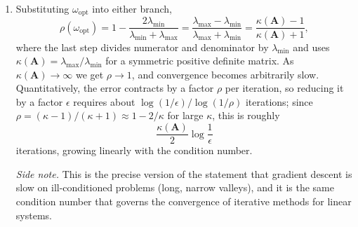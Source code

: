 \begin{solution}
\begin{enumerate}[label=(\alph*)]
        because $\lambda \mapsto 1 - \omega\lambda$ is decreasing, so the extreme values over the eigenvalues are attained at $\lambda_{\min}$ and $\lambda_{\max}$. Each term is a V-shaped (piecewise linear) function of $\omega$, with vertices at $\omega = 1/\lambda_{\min}$ and $\omega = 1/\lambda_{\max}$ respectively, so their maximum is minimized where the decreasing branch of the first meets the increasing branch of the second:
        \[
            1 - \omega\lambda_{\min} = \omega\lambda_{\max} - 1
            \quad \Longrightarrow \quad
            \omega_{\text{opt}} = \frac{2}{\lambda_{\min} + \lambda_{\max}}.
        \]
        \item Substituting $\omega_{\text{opt}}$ into either branch,
        \[
            \rho(\omega_{\text{opt}}) = 1 - \frac{2\lambda_{\min}}{\lambda_{\min} + \lambda_{\max}} = \frac{\lambda_{\max} - \lambda_{\min}}{\lambda_{\max} + \lambda_{\min}} = \frac{\kappa(\mathbf{A}) - 1}{\kappa(\mathbf{A}) + 1},
        \]
        where the last step divides numerator and denominator by $\lambda_{\min}$ and uses $\kappa(\mathbf{A}) = \lambda_{\max}/\lambda_{\min}$ for a symmetric positive definite matrix. As $\kappa(\mathbf{A}) \to \infty$ we get $\rho \to 1$, and convergence becomes arbitrarily slow. Quantitatively, the error contracts by a factor $\rho$ per iteration, so reducing it by a factor $\epsilon$ requires about $\log(1/\epsilon) / \log(1/\rho)$ iterations; since $\rho = (\kappa-1)/(\kappa+1) \approx 1 - 2/\kappa$ for large $\kappa$, this is roughly
        \[
            \frac{\kappa(\mathbf{A})}{2} \log\frac{1}{\epsilon}
        \]
        iterations, growing linearly with the condition number.

        \emph{Side note.} This is the precise version of the statement that gradient descent is slow on ill-conditioned problems (long, narrow valleys), and it is the same condition number that governs the convergence of iterative methods for linear systems.
    \end{enumerate}
    
\end{solution}

